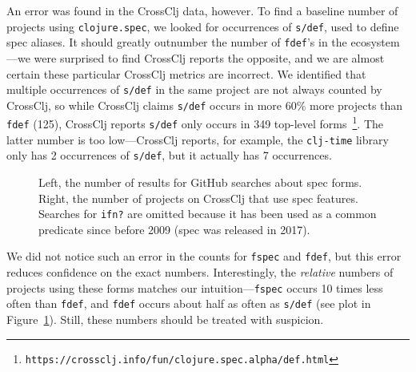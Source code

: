 An error was found in the CrossClj data, however.
To find a baseline number of projects using \texttt{clojure.spec}, we looked for occurrences of
\texttt{s/def}, used to define spec
aliases. It should greatly outnumber the number of \texttt{fdef}'s in the ecosystem---we were
surprised to find CrossClj reports the opposite, and
we are almost certain these particular CrossClj metrics are incorrect.
We identified that multiple occurrences of \texttt{s/def} in the same project are not always counted by CrossClj,
so while CrossClj claims \texttt{s/def} occurs in more 60\% more projects than \texttt{fdef} (125), 
CrossClj reports \texttt{s/def} only occurs in 349 top-level 
forms~\footnote{\texttt{https://crossclj.info/fun/clojure.spec.alpha/def.html}}.
The latter number is too low---CrossClj reports, for example, the \texttt{clj-time}
library only has 2 occurrences of \texttt{s/def}, but it actually has 7 occurrences.

\begin{figure}
\caption{Left, the number of results for GitHub searches about spec forms.
Right, the number of projects on CrossClj that use spec features.
  Searches for \texttt{ifn?} are omitted because
  it has been used as a common predicate since before 2009 (spec was released in 2017).
  }
  \label{frequencybargraphs}
\end{figure}

We did not notice such an error in the counts for \texttt{fspec} and \texttt{fdef}, but
this error reduces confidence on the exact numbers. Interestingly, the \emph{relative}
numbers of projects using these forms matches our intuition---\texttt{fspec} occurs
10 times less often than \texttt{fdef}, and \texttt{fdef} occurs about half as often as \texttt{s/def}
(see plot in Figure~\ref{frequencybargraphs}).
Still, these numbers should be treated with suspicion.

